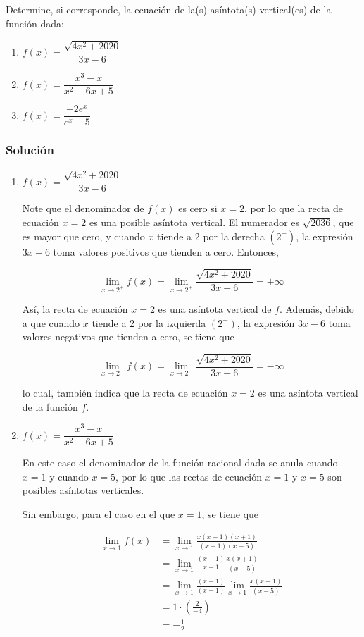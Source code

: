 Determine, si corresponde, la ecuación de la(s) asíntota(s) vertical(es) de la función dada:

\begin{enumerate}[label=\alph*)]
  \item $f(x)=\dfrac{\sqrt{4 x^2+2020}}{3 x-6}$
  \item $f(x)=\dfrac{x^3-x}{x^2-6 x+5}$
  \item $f(x)=\dfrac{-2 e^x}{e^x-5}$
\end{enumerate}

\begin{soluciones}
  \subsubsection*{Solución}

  \begin{enumerate}[label=\alph*)]
    \item $f(x)=\dfrac{\sqrt{4 x^2+2020}}{3 x-6}$
    
    Note que el denominador de $f(x)$ es cero si $x=2$, por lo que la recta de ecuación $x=2$ es una posible asíntota vertical. El numerador es $\sqrt{2036}$, que es mayor que cero, y cuando $x$ tiende a 2 por la derecha $\left(2^{+}\right)$, la expresión $3 x-6$ toma valores positivos que tienden a cero. Entonces,

    $$
    \lim _{x \rightarrow 2^{+}} f(x)=\lim _{x \rightarrow 2^{+}} \frac{\sqrt{4 x^2+2020}}{3 x-6}=+\infty
    $$

    Así, la recta de ecuación $x=2$ es una asíntota vertical de $f$.
    Además, debido a que cuando $x$ tiende a 2 por la izquierda $\left(2^{-}\right)$, la expresión $3 x-6$ toma valores negativos que tienden a cero, se tiene que

    $$
    \lim _{x \rightarrow 2^{-}} f(x)=\lim _{x \rightarrow 2^{-}} \frac{\sqrt{4 x^2+2020}}{3 x-6}=-\infty
    $$

    lo cual, también indica que la recta de ecuación $x=2$ es una asíntota vertical de la función $f$.

    \item $f(x)=\dfrac{x^3-x}{x^2-6 x+5}$
    
    En este caso el denominador de la función racional dada se anula cuando $x=1$ y cuando $x=5$, por lo que las rectas de ecuación $x=1$ y $x=5$ son posibles asíntotas verticales.

    Sin embargo, para el caso en el que $x=1$, se tiene que

    $$
    \begin{aligned}
    \lim _{x \rightarrow 1} f(x) & =\lim _{x \rightarrow 1} \frac{x(x-1)(x+1)}{(x-1)(x-5)} \\
    & =\lim _{x \rightarrow 1} \frac{(x-1)}{x-1} \frac{x(x+1)}{(x-5)} \\
    & =\lim _{x \rightarrow 1} \frac{(x-1)}{(x-1)} \lim _{x \rightarrow 1} \frac{x(x+1)}{(x-5)} \\
    & =1 \cdot\left(\frac{2}{-4}\right) \\
    & =-\frac{1}{2}
    \end{aligned}
    $$


\end{enumerate}
\end{soluciones}

